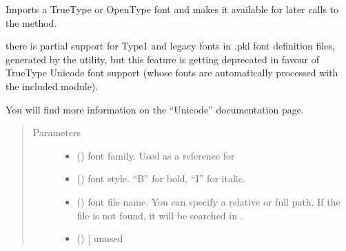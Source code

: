 \documentclass[letterpaper,10pt,english]{sphinxmanual}
\begin{document}
\begin{fulllineitems}
\begin{fulllineitems}
\label{\detokenize{generated/quality_assessment.quality_pdf_report.DefectReportPDF.add_font:quality_assessment.quality_pdf_report.DefectReportPDF.add_font}}
\sphinxAtStartPar
Imports a TrueType or OpenType font and makes it available
for later calls to the  method.

\sphinxAtStartPar
{} there is partial support for Type1 and legacy fonts in .pkl font definition files,
generated by the  utility, but this feature is getting deprecated in favour of TrueType Unicode font support
(whose fonts are automatically processed with the included  module).

\sphinxAtStartPar
You will find more information on the “Unicode” documentation page.
\begin{quote}\begin{description}
\item[{Parameters}] \leavevmode\begin{itemize}
\item {} 
\sphinxAtStartPar
{} () \textendash{} font family. Used as a reference for 

\item {} 
\sphinxAtStartPar
{} () \textendash{} font style. “B” for bold, “I” for italic.

\item {} 
\sphinxAtStartPar
{} () \textendash{} font file name. You can specify a relative or full path.
If the file is not found, it will be searched in .

\item {} 
\sphinxAtStartPar
{} () \textendash{} {[}\sphinxstylestrong{DEPRECATED}{]} unused


\end{itemize}
\end{description}
\end{quote}
\end{fulllineitems}
\end{fulllineitems}
\end{document}
